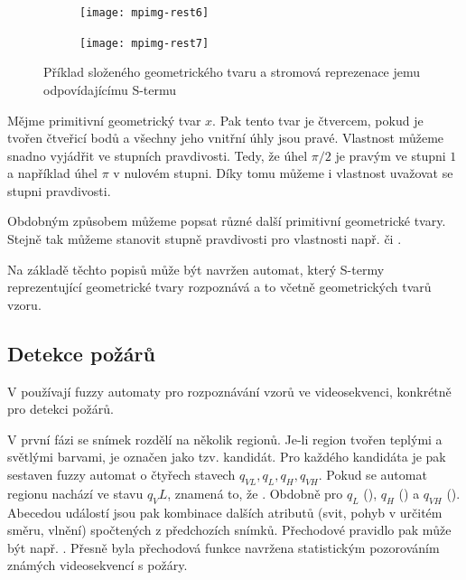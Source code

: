 
\begin{figure} 
 \begin{subfigure}{0.4\textwidth}
  \texttt{[image: mpimg-rest6]}
 \end{subfigure}
 \begin{subfigure}{0.4\textwidth}
  \texttt{[image: mpimg-rest7]}
 \end{subfigure}
 
 \caption{Příklad složeného geometrického tvaru a stromová reprezenace jemu odpovídajícímu S-termu} \label{img:Geoms}
\end{figure}

Mějme primitivní geometrický tvar $x$. Pak tento tvar je čtvercem, pokud je tvořen čtveřicí bodů a všechny jeho vnitřní úhly jsou pravé. Vlastnost  můžeme snadno vyjádřit ve stupních pravdivosti. Tedy, že úhel $\pi/2$ je pravým ve stupni $1$ a například úhel $\pi$ v nulovém stupni. Díky tomu můžeme i vlastnost  uvažovat se stupni pravdivosti.

Obdobným způsobem můžeme popsat různé další primitivní geometrické tvary. Stejně tak můžeme stanovit stupně pravdivosti pro vlastnosti např.  či .

Na základě těchto popisů může být navržen automat, který S-termy reprezentující geometrické tvary rozpoznává a to včetně geometrických tvarů  vzoru.

\subsection{Detekce požárů}
V \cite{HamKoNam-FirFlaDetBasFuzFinAut, KoHamNam-ModForFuFiAuDetIrrFirFla} používají fuzzy automaty pro rozpoznávání vzorů ve videosekvenci, konkrétně pro detekci požárů.

V první fázi se snímek rozdělí na několik regionů. Je-li region tvořen teplými a světlými barvami, je označen jako tzv. kandidát. Pro každého kandidáta je pak sestaven fuzzy automat o čtyřech stavech $q_{VL}, q_{L}, q_{H}, q_{VH}$. Pokud se automat regionu nachází ve stavu $q_VL$, znamená to, že . Obdobně pro $q_{L}$ (), $q_{H}$ () a $q_{VH}$ (). Abecedou událostí jsou pak kombinace dalších atributů (svit, pohyb v určitém směru, vlnění) spočtených z předchozích snímků. Přechodové pravidlo pak může být např. . Přesně byla přechodová funkce navržena statistickým pozorováním známých videosekvencí s požáry.

